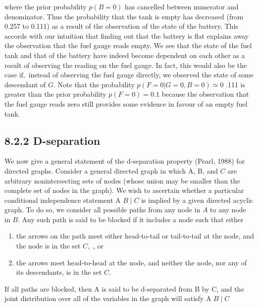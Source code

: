 \documentclass[
  10
]{article}
\begin{document}
where the prior probability \(p ( B = 0 )\) has cancelled between
numerator and denominator. Thus the probability that the tank is empty
has decreased (from 0.257 to 0.111) as a result of the observation of
the state of the battery. This accords with our intuition that finding
out that the battery is flat explains away the observation that the fuel
gauge reads empty. We see that the state of the fuel tank and that of
the battery have indeed become dependent on each other as a result of
observing the reading on the fuel gauge. In fact, this would also be the
case \({ \mathrm { i f } } ,\) instead of observing the fuel gauge
directly, we observed the state of some descendant of \(G .\) Note that
the probability \(p ( F = 0 | G = 0 , B = 0 ) \simeq 0\) .111 is greater
than the prior probability \(p ( F = 0 ) = 0 . 1\) because the
observation that the fuel gauge reads zero still provides some evidence
in favour of an empty fuel tank.

\subsection{8.2.2 D-separation}\label{d-separation}

We now give a general statement of the d-separation property (Pearl,
1988) for directed graphs. Consider a general directed graph in which A,
B, and \(C\) are arbitrary nonintersecting sets of nodes (whose union
may be smaller than the complete set of nodes in the graph). We wish to
ascertain whether a particular conditional independence statement A
\(B \mid C\) is implied by a given directed acyclic graph. To do so, we
consider all possible paths from any node in \(A\) to any node in
\(B .\) Any such path is said to be blocked if it includes a node such
that either

\begin{enumerate}
\def\labelenumi{(\alph{enumi})}
\item
  the arrows on the path meet either head-to-tail or tail-to-tail at the
  node, and the node is in the set \(C ,\) , or
\item
  the arrows meet head-to-head at the node, and neither the node, nor
  any of its descendants, is in the set \(C .\)
\end{enumerate}

If all paths are blocked, then A is said to be d-separated from B by C,
and the joint distribution over all of the variables in the graph will
satisfy A \(B \mid C\)
\end{document}
